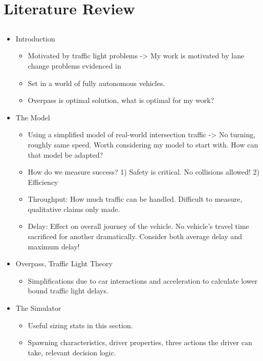 \chapter{Literature Review}
\label{cha:Literature Review}

\section{}
\label{sec:Dresner2004}

\begin{itemize}
\item Introduction
\begin{itemize}
\item Motivated by traffic light problems -> My work is motivated by lane change problems evidenced in \citet{Laval2006}
\item Set in a world of fully autonomous vehicles.
\item Overpass is optimal solution, what is optimal for my work?
\end{itemize}
\item The Model
\begin{itemize}
\item Using a simplified model of real-world intersection traffic -> No turning, roughly same speed. Worth considering my model to start with. How can that model be adapted?
\item How do we measure success? 1) Safety is critical. No collisions allowed! 2) Efficiency
\item Throughput: How much traffic can be handled. Difficult to measure, qualitative claims only made.
\item Delay: Effect on overall journey of the vehicle. No vehicle's travel time sacrificed for another dramatically. Consider both average delay and maximum delay!
\end{itemize}
\item Overpass, Traffic Light Theory
\begin{itemize}
\item Simplifications due to car interactions and acceleration to calculate lower bound traffic light delays.
\end{itemize}
\item The Simulator
\begin{itemize}
\item Useful sizing stats in this section.
\item Spawning characteristics, driver properties, three actions the driver can take, relevant decision logic.

\end{itemize}
\end{itemize}
